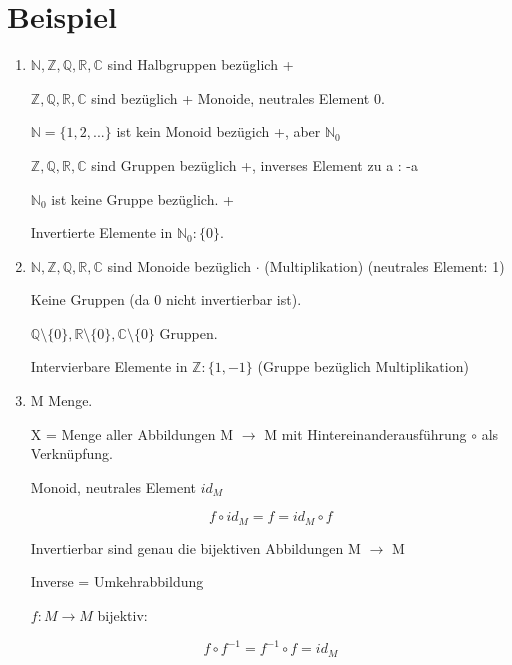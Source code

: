 \documentclass[a4paper, openany]{book}
\begin{document}
  \section{Beispiel}

  \begin{enumerate}[label=(\alph*)]
    \item $\mathbb{N}, \mathbb{Z}, \mathbb{Q}, \mathbb{R}, \mathbb{C}$ sind Halbgruppen bezüglich +

    $\mathbb{Z}, \mathbb{Q}, \mathbb{R}, \mathbb{C}$ sind bezüglich + Monoide, neutrales Element 0.

    $\mathbb{N} = \lbrace 1,2,... \rbrace$ ist kein Monoid bezügich +, aber $\mathbb{N}_0$

    $\mathbb{Z}, \mathbb{Q}, \mathbb{R}, \mathbb{C}$ sind Gruppen bezüglich +, inverses Element zu a : -a

    $\mathbb{N}_0$ ist keine Gruppe bezüglich. + 

    Invertierte Elemente in $\mathbb{N}_0: \lbrace 0 \rbrace$.

    \item $\mathbb{N}, \mathbb{Z}, \mathbb{Q}, \mathbb{R}, \mathbb{C}$ sind Monoide bezüglich $\cdot$ (Multiplikation) (neutrales Element: 1)

    Keine Gruppen (da 0 nicht invertierbar ist).

    $\mathbb{Q} \setminus \lbrace 0 \rbrace, \mathbb{R} \setminus \lbrace 0 \rbrace, \mathbb{C} \setminus \lbrace 0 \rbrace$ Gruppen.

    Intervierbare Elemente in $\mathbb{Z}: \lbrace 1, -1 \rbrace$ (Gruppe bezüglich Multiplikation)

    \item M Menge. 

    X = Menge aller Abbildungen M $\rightarrow$ M mit Hintereinanderausführung $\circ$ als Verknüpfung.

    Monoid, neutrales Element $id_M$

    \begin{equation}
      f \circ id_M = f = id_M \circ f
    \end{equation}

    Invertierbar sind genau die bijektiven Abbildungen M $\rightarrow$ M

    Inverse = Umkehrabbildung

    $f: M \rightarrow M$ bijektiv:

    \begin{equation}
      f \circ f^{-1} = f^{-1} \circ f = id_M
    \end{equation}


\end{enumerate}
\end{document}
